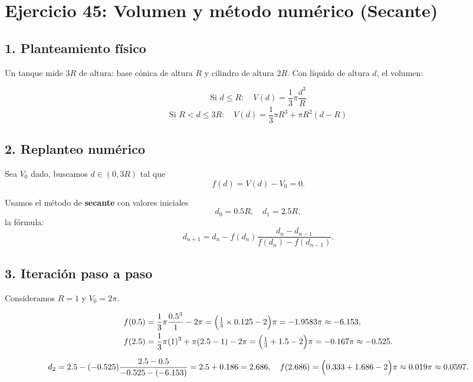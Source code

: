 \documentclass[12pt]{article}
\begin{document}
\begin{center}
\begin{tcolorbox}[title=Método del punto fijo,
                  colback=white,
                  colframe=black,
                  breakable, enhanced]
\begin{lstlisting}[style=mypython]
\end{lstlisting}

\end{tcolorbox}








\section*{Ejercicio 45: Volumen y método numérico (Secante)}

\subsection*{1. Planteamiento físico}

Un tanque mide \(3R\) de altura: base cónica de altura \(R\) y cilindro de altura \(2R\).  
Con líquido de altura \(d\), el volumen:

\[
\text{Si }d \leq R:\quad
V(d)=\frac{1}{3}\pi \frac{d^3}{R}
\]
\[
\text{Si }R<d\le3R:\quad
V(d)=\frac{1}{3}\pi R^3 + \pi R^2(d-R)
\]

\subsection*{2. Replanteo numérico}

Sea \(V_0\) dado, buscamos \(d\in(0,3R)\) tal que
\[
f(d)=V(d)-V_0=0.
\]

Usamos el método de \textbf{secante} con valores iniciales
\[
d_0=0.5R,\quad d_1=2.5R,
\]
la fórmula:
\[
d_{n+1}=d_n - f(d_n)\frac{d_n-d_{n-1}}{f(d_n)-f(d_{n-1})}.
\]

\subsection*{3. Iteración paso a paso}

Consideramos \(R=1\) y \(V_0=2\pi\).

\[
\begin{aligned}
f(0.5)&=\frac{1}{3}\pi\frac{0.5^3}{1}-2\pi
=\Bigl(\tfrac{1}{3}\times0.125-2\Bigr)\pi=-1.9583\pi\approx-6.153,\\
f(2.5)&=\frac{1}{3}\pi(1)^3 + \pi(2.5-1) -2\pi
=\Bigl(\tfrac{1}{3}+1.5-2\Bigr)\pi=-0.167\pi\approx-0.525.
\end{aligned}
\]

\[
d_2=2.5 -(-0.525)\frac{2.5-0.5}{-0.525-(-6.153)}
=2.5 +0.186=2.686,\quad
f(2.686)=\Bigl(0.333+1.686-2\Bigr)\pi\approx0.019\pi\approx0.0597.
\]


\end{center}
\end{document}
